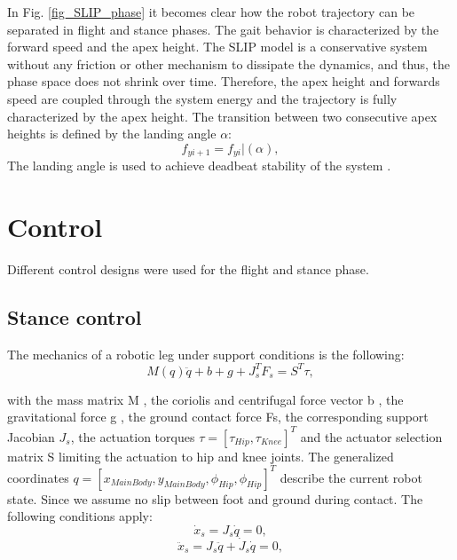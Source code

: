 \documentclass[10pt,conference]{IEEEtran}
\begin{document}
In Fig. \ref{fig_SLIP_phase} it becomes clear how the robot trajectory can be separated in flight and stance phases. The gait behavior is characterized by the forward speed and the apex height.
The SLIP model is a conservative system without any friction or other mechanism to dissipate the dynamics, and thus, the phase space does not shrink over time. 
Therefore, the apex height and forwards speed are coupled through the system energy and the trajectory is fully characterized by the apex height. 
The transition between two consecutive apex heights is defined by the landing angle \(\alpha\):
\begin{equation}
   {f}_{yi+1}={f}_{yi}|(\alpha),
\end{equation}
The landing angle is used to achieve deadbeat stability of the system \cite{Wu2014} \cite{Hutter2010}.




\section{Control}
\label{sec:Control}
Different control designs were used for the flight and stance phase. 

\subsection{Stance control}
The mechanics of a robotic leg under support conditions is the following:
\begin{equation}
   M(q)\ddot{q}+b+g+{J}_{s}^{T}F_{s}=S^{T}{\tau},
\end{equation}

with the mass matrix M , the coriolis and centrifugal force vector b , the gravitational force g , the ground contact force
Fs, the corresponding support Jacobian \({J}_{s}\), the actuation torques \(\tau = [{\tau}_{Hip}, {\tau}_{Knee}]^{T}\) and the actuator selection matrix S
limiting the actuation to hip and knee joints. The generalized coordinates  \(q = [x_{MainBody}, y_{MainBody}, {\phi}_{Hip}, {\phi}_{Hip}]^{T}\)
describe the current robot state. Since we assume no slip between foot and ground during contact. The following conditions apply: 
\begin{equation}
   \dot{x}_{s} = J_{s} \dot{q} = 0,
\end{equation}
\begin{equation}
   \ddot{x}_{s} = J_{s} \ddot{q} + \dot{J}_{s} \dot{q}=0,
\end{equation}
\end{document}
